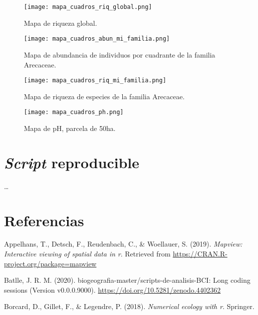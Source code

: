 \documentclass[11pt,]{article}
\begin{document}
\begin{figure}
\centering
\texttt{[image: mapa\_cuadros\_riq\_global.png]}
\caption{Mapa de riqueza global. \label{fig:mapa_cuadros_riq_global}}
\end{figure}

\begin{figure}
\centering
\texttt{[image: mapa\_cuadros\_abun\_mi\_familia.png]}
\caption{Mapa de abundancia de individuos por cuadrante de la familia
Arecaceae. \label{fig:mapa_cuadros_abun_mi_familia}}
\end{figure}

\begin{figure}
\centering
\texttt{[image: mapa\_cuadros\_riq\_mi\_familia.png]}
\caption{Mapa de riqueza de especies de la familia Arecaceae.
\label{fig:mapa_cuadros_riq_mi_familia}}
\end{figure}

\begin{figure}
\centering
\texttt{[image: mapa\_cuadros\_ph.png]}
\caption{Mapa de pH, parcela de 50ha. \label{fig:mapa_cuadros_pH}}
\end{figure}

\section{\texorpdfstring{\emph{Script}
reproducible}{Script reproducible}}\label{script-reproducible}

\ldots

\section*{Referencias}\label{referencias}

\hypertarget{refs}{}
\hypertarget{ref-MapView}{}
Appelhans, T., Detsch, F., Reudenbach, C., \& Woellauer, S. (2019).
\emph{Mapview: Interactive viewing of spatial data in r}. Retrieved from
\url{https://CRAN.R-project.org/package=mapview}

\hypertarget{ref-jose_ramon_martinez_batlle_2020_4402362}{}
Batlle, J. R. M. (2020). biogeografia-master/scripts-de-analisis-BCI:
Long coding sessions (Version v0.0.0.9000).
\url{https://doi.org/10.5281/zenodo.4402362}

\hypertarget{ref-borcard2018numerical}{}
Borcard, D., Gillet, F., \& Legendre, P. (2018). \emph{Numerical ecology
with r}. Springer.
\end{document}
